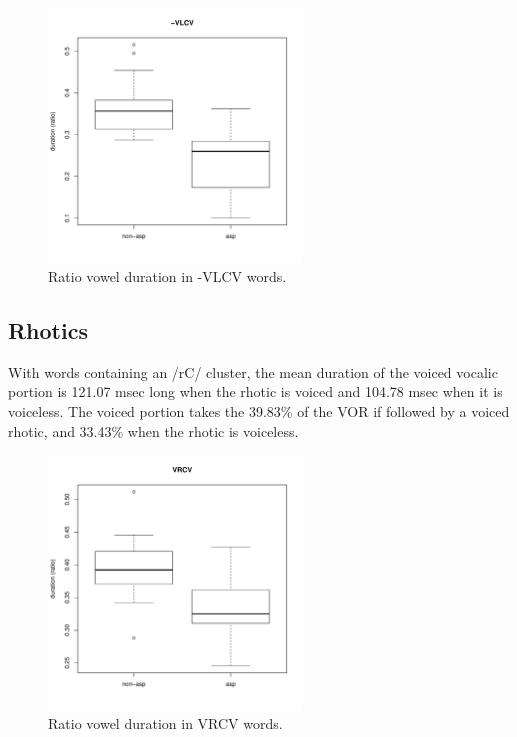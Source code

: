 \documentclass[11pt,a4paper,openany]{memoir}\usepackage[]{graphicx}\usepackage[]{color}
\newenvironment{knitrout}{}{} %
\begin{document}
\begin{figure}
\centering
\begin{knitrout}
\color{fgcolor}
\includegraphics[width=0.6\textwidth]{img/di-lat-box-1} 

\end{knitrout}
\caption{Ratio vowel duration in -VLCV words.}
\label{f:dilat}
\end{figure}

\subsection{Rhotics}



With words containing an /rC/ cluster, the mean duration of the voiced vocalic portion is 121.07 msec long when the rhotic is voiced and 104.78 msec when it is voiceless.
The voiced portion takes the 39.83\% of the VOR if followed by a voiced rhotic, and 33.43\% when the rhotic is voiceless.

\begin{figure}
\centering
\begin{knitrout}
\color{fgcolor}
\includegraphics[width=0.6\textwidth]{img/di-rho-box-1} 

\end{knitrout}
\caption{Ratio vowel duration in VRCV words.}
\label{f:dirho}
\end{figure}
\end{document}
